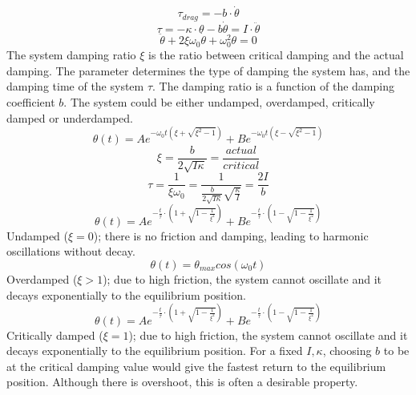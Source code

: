 \documentclass[\main/master.tex]{subfiles}
\begin{document}
\begin{equation}
\tau_{drag} = -b\cdot\dot{\theta}   \label{eqn:friction_torque}
\end{equation} 
\begin{equation}
\tau = -\kappa\cdot\theta - b\dot{\theta}  = I\cdot\ddot{\theta}   \label{eqn:damped_motion_equation}
\end{equation} 
\begin{equation}
\ddot{\theta} + 2\xi\omega_0\dot{\theta} + \omega_0^2\theta = 0   \label{eqn:damped_motion_equation}
\end{equation}
\noindent
The system damping ratio $\xi$ is the ratio between critical damping and the actual damping. The parameter determines the type of damping the system has, and the damping time of the system $\tau$. The damping ratio is a function of the damping coefficient $b$. The system could be either undamped, overdamped, critically damped or underdamped.
\begin{equation}
\theta(t) = Ae^{-\omega_0 t(\xi+\sqrt{\xi^2-1})} + Be^{-\omega_0 t(\xi-\sqrt{\xi^2-1})}    \label{eqn:damped_motion_equation}
\end{equation} 
\begin{equation}
\xi = \frac{b}{2\sqrt{I\kappa}} = \frac{actual}{critical}  \label{eqn:damped_motion_equation}
\end{equation}
\begin{equation}
\tau = \frac{1}{\xi\omega_0} = \frac{1}{\frac{b}{2\sqrt{I\kappa}}\sqrt{\frac{\kappa}{I}} }= \frac{2I}{b}  \label{eqn:damping_time}
\end{equation}
\begin{equation}
\theta(t) = Ae^{-\frac{t}{\tau}\cdot(1+\sqrt{1-\frac{1}{\xi^2}})} + Be^{-\frac{t}{\tau}\cdot(1-\sqrt{1-\frac{1}{\xi^2}})}    \label{eqn:damped_motion_equation}
\end{equation}
Undamped ($\xi = 0$); there is no friction and damping, leading to harmonic oscillations without decay.
\begin{equation}
\theta(t) = \theta_{max}cos(\omega_0 t )    \label{eqn:undamped_motion_equation}
\end{equation}
Overdamped ($\xi > 1$); due to high friction, the system cannot oscillate and it decays exponentially to the equilibrium position.
\begin{equation}
\theta(t) = Ae^{-\frac{t}{\tau}\cdot(1+\sqrt{1-\frac{1}{\xi^2}})} + Be^{-\frac{t}{\tau}\cdot(1-\sqrt{1-\frac{1}{\xi^2}})}    \label{eqn:overdamped_motion_equation}
\end{equation}
Critically damped ($\xi = 1$); due to high friction, the system cannot oscillate and it decays exponentially to the equilibrium position. For a fixed $I, \kappa$, choosing $b$ to be at the critical damping value would give the fastest return to the equilibrium position. Although there is overshoot, this is often a desirable property.
\end{document}
